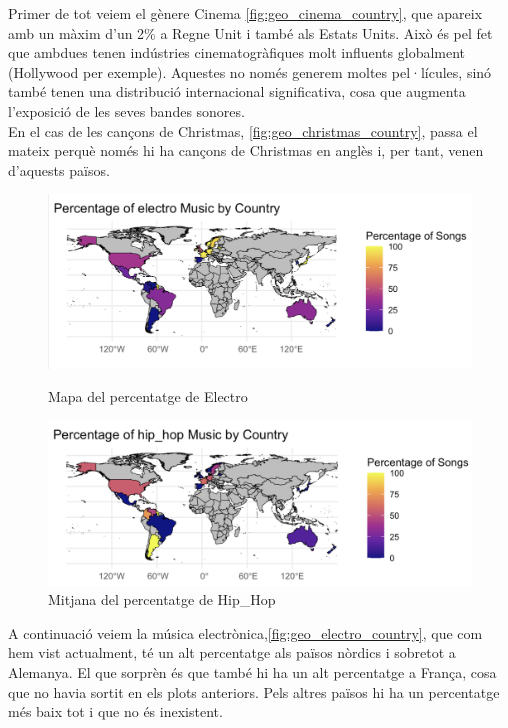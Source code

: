 Primer de tot veiem el gènere Cinema \ref{fig:geo_cinema_country}, que apareix amb un màxim d'un 2\% a Regne Unit i també als Estats Units. Això és pel fet que ambdues tenen indústries cinematogràfiques molt influents globalment (Hollywood per exemple). Aquestes no només generem moltes pel·lícules, sinó també tenen una distribució internacional significativa, cosa que augmenta l'exposició de les seves bandes sonores. \\
En el cas de les cançons de Christmas, \ref{fig:geo_christmas_country}, passa el mateix perquè només hi ha cançons de Christmas en anglès i, per tant, venen d'aquests països.

\begin{figure}[H]
\centering
    \begin{minipage}{.5\textwidth}
        \centering
        \includegraphics[width=0.99\linewidth]{Images/7_Geospatial/1_descriptive/percent_genere_per_pais/per_electro.png}
        \caption{Mapa del percentatge de Electro}
        \label{fig:geo_electro_country}
    \end{minipage}%
    \begin{minipage}{.5\textwidth}
        \centering
        \includegraphics[width=0.99\linewidth]{Images/7_Geospatial/1_descriptive/percent_genere_per_pais/per_hiphop.png}
        \caption{Mitjana del percentatge de Hip\_Hop}
        \label{fig:geo_hiphop_country}
    \end{minipage}%
\end{figure}
A continuació veiem la música electrònica,\ref{fig:geo_electro_country}, que com hem vist actualment, té un alt percentatge als països nòrdics i sobretot a Alemanya. El que sorprèn és que també hi ha un alt percentatge a França, cosa que no havia sortit en els plots anteriors. Pels altres països hi ha un percentatge més baix tot i que no és inexistent. \\

